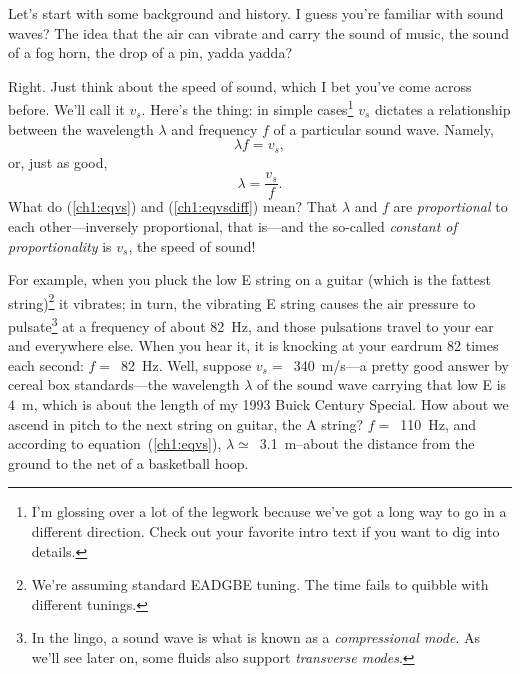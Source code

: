






Let's start with some background and history. I guess you're familiar with sound
waves? The idea that the air can vibrate and carry the sound of music, the sound
of a fog horn, the drop of a pin, yadda yadda?

Right. Just think about the speed of sound, which I bet you've come across
before. We'll call it $v_s$. Here's the thing: in simple cases\footnote{I'm
  glossing over a lot of the legwork because we've got a long way to go in a
  different direction. Check out your favorite intro text if you want to dig
  into details.}  $v_s$ dictates a relationship between the wavelength $\lambda$
and frequency $f$ of a particular sound wave. Namely,
\begin{equation}
  \label{ch1:eqvs}
  \lambda f = v_s,
\end{equation}
or, just as good,
\begin{equation}
  \label{ch1:eqvsdiff}
  \lambda = \dfrac{v_s}{f}.
\end{equation}
What do (\ref{ch1:eqvs}) and (\ref{ch1:eqvsdiff}) mean? That $\lambda$ and $f$
are \emph{proportional} to each other---inversely proportional, that is---and
the so-called \emph{constant of proportionality} is $v_s$, the speed of
sound!


For example, when you pluck the low E string on a guitar (which is the fattest
string)\footnote{We're assuming standard EADGBE tuning. The time fails to
  quibble with different tunings.} it vibrates; in turn, the vibrating E string
causes the air pressure to pulsate\footnote{In the lingo, a sound wave is what
  is known as a \emph{compressional mode}. As we'll see later on, some fluids
  also support \emph{transverse modes}.} at a frequency of about 82~Hz, and
those pulsations travel to your ear and everywhere else. When you hear it, it is
knocking at your eardrum 82 times each second: $f = $~82~Hz.  Well, suppose
$v_s =$~340~m/s---a pretty good answer by cereal box standards---the wavelength
$\lambda$ of the sound wave carrying that low E is 4~m, which is about the
length of my 1993 Buick Century Special. How about we ascend in pitch to the
next string on guitar, the A string?  $f = $~110~Hz, and according to
equation~(\ref{ch1:eqvs}), $\lambda \simeq$~3.1~m--about the distance from the
ground to the net of a basketball hoop.

